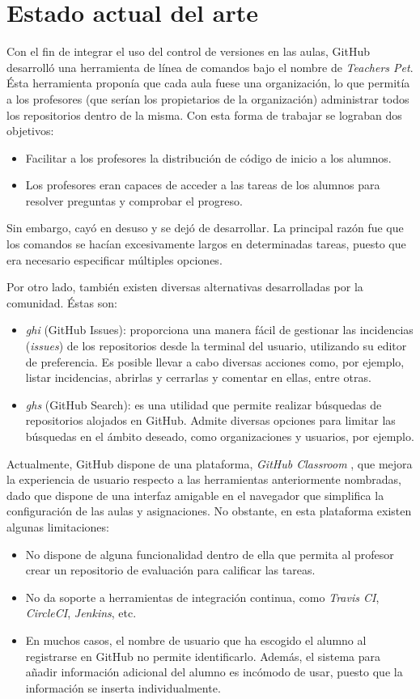 \section{Estado actual del arte}
\label{1:sec:2}
Con el fin de integrar el uso del control de versiones en las aulas, GitHub desarrolló una herramienta de línea de comandos bajo el nombre de {\it Teachers Pet}. Ésta herramienta proponía que cada aula fuese una
organización, lo que permitía a los profesores (que serían los propietarios de la organización) administrar todos los repositorios dentro de la misma. Con esta forma de trabajar se lograban dos objetivos:
\begin{itemize}
  \item Facilitar a los profesores la distribución de código de inicio a los alumnos.
  \item Los profesores eran capaces de acceder a las tareas de los alumnos para resolver preguntas y comprobar el progreso.
\end{itemize}
Sin embargo, cayó en desuso y se dejó de desarrollar. La principal razón fue que los comandos se hacían excesivamente largos en determinadas tareas, puesto que era necesario especificar múltiples opciones.
\bigskip

Por otro lado, también existen diversas alternativas desarrolladas por la comunidad. Éstas son:
\begin{itemize}
  \item {\it ghi} \cite{B1} (GitHub Issues): proporciona una manera fácil de gestionar las incidencias ({\it issues}) de los repositorios desde la terminal del usuario, utilizando su editor de preferencia. Es posible llevar a cabo diversas acciones como, por ejemplo,
  listar incidencias, abrirlas y cerrarlas y comentar en ellas, entre otras.
  \item {\it ghs} \cite{B2} (GitHub Search): es una utilidad que permite realizar búsquedas de repositorios alojados en GitHub. Admite diversas opciones para limitar las búsquedas en el ámbito deseado, como organizaciones y usuarios, por ejemplo.
\end{itemize}

Actualmente, GitHub dispone de una plataforma, {\it GitHub Classroom} \cite{B3}, que mejora la experiencia de usuario respecto a las herramientas anteriormente nombradas, dado que dispone de una interfaz amigable en el navegador que simplifica
la configuración de las aulas y asignaciones. No obstante, en esta plataforma existen algunas limitaciones:
\begin{itemize}
  \item No dispone de alguna funcionalidad dentro de ella que permita al profesor crear un repositorio de evaluación para calificar las tareas.
  \item No da soporte a herramientas de integración continua, como {\it Travis CI}, {\it CircleCI}, {\it Jenkins}, etc.
  \item En muchos casos, el nombre de usuario que ha escogido el alumno al registrarse en GitHub no permite identificarlo. Además, el sistema para añadir información adicional del alumno es incómodo de usar,
  puesto que la información se inserta individualmente.
\end{itemize}

